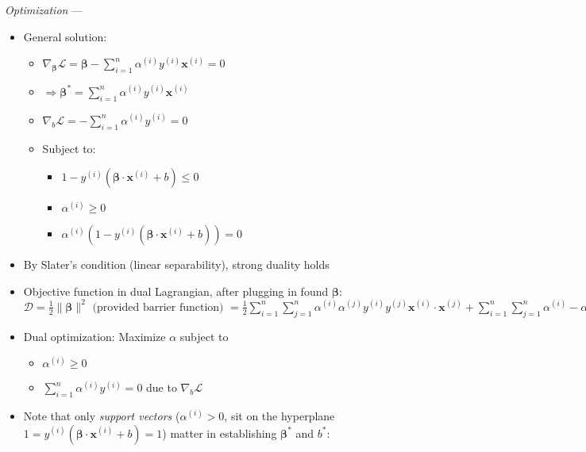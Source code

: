 \emph{Optimization} ---
\begin{itemize}
    \item General solution:
    \begin{itemize}
        \item $\nabla_{\boldsymbol{\beta}} \mathcal{L} =  \boldsymbol{\beta} - \sum_{i=1}^n \alpha^{(i)} y^{(i)} \boldsymbol{x}^{(i)} = 0$
        \item $\Rightarrow \boldsymbol{\beta}^{*} = \sum_{i=1}^n \alpha^{(i)} y^{(i)}\boldsymbol{x}^{(i)}$
        \item $\nabla_b \mathcal{L} = - \sum_{i=1}^n \alpha^{(i)} y^{(i)} = 0$
        \item Subject to:
        \begin{itemize}
            \item $1 - y^{(i)} (\boldsymbol{\beta} \cdot \boldsymbol{x}^{(i)} + b) \leq 0$
            \item $\alpha^{(i)} \geq 0$
            \item $\alpha^{(i)} (1 - y^{(i)} (\boldsymbol{\beta} \cdot \boldsymbol{x}^{(i)} + b)) = 0$
        \end{itemize}
    \end{itemize}
    \item By Slater's condition (linear separability), strong duality holds
    \item Objective function in dual Lagrangian, after plugging in found $\boldsymbol{\beta}$: $\mathcal{D} = \frac{1}{2} \| \boldsymbol{\beta} \|^2  \textrm{ (provided barrier function) }= \frac{1}{2}  \sum_{i=1}^n  \sum_{j=1}^n \alpha^{(i)}\alpha^{(j)} y^{(i)}y^{(j)} \boldsymbol{x}^{(i)} \cdot \boldsymbol{x}^{(j)} + \sum_{i=1}^n  \sum_{j=1}^n \alpha^{(i)} - \alpha^{(i)}\alpha^{(j)} y^{(i)}y^{(j)} \boldsymbol{x}^{(i)} \cdot \boldsymbol{x}^{(j)} = \sum_{i=1}^n \alpha^{(i)} - \frac{1}{2}  \sum_{i=1}^n  \sum_{j=1}^n \alpha^{(i)}\alpha^{(j)} y^{(i)}y^{(j)} \boldsymbol{x}^{(i)} \cdot \boldsymbol{x}^{(j)}$
    \item Dual optimization: Maximize $\alpha$ subject to 
    \begin{itemize}
        \item $\alpha^{(i)} \geq 0$ 
        \item $\sum_{i=1}^n \alpha^{(i)} y^{(i)} = 0$ due to $\nabla_b \mathcal{L}$
    \end{itemize}
    \item Note that only \emph{support vectors} ($\alpha^{(i)} > 0$, sit on the hyperplane $ 1 = y^{(i)} (\boldsymbol{\beta} \cdot \boldsymbol{x}^{(i)} + b) = 1$) matter in establishing $\boldsymbol{\beta}^{*}$ and $b^*$:

\end{itemize}
